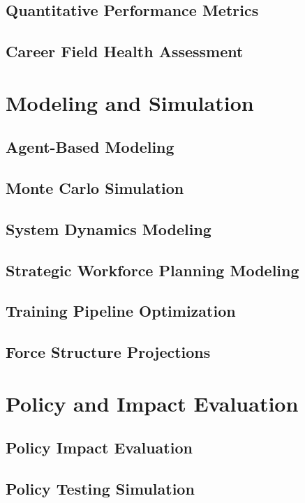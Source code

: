 \documentclass[12pt,a4paper]{article}
\begin{document}
\subsection{Quantitative Performance Metrics}


\subsection{Career Field Health Assessment}


\newpage
\section{Modeling and Simulation}

\subsection{Agent-Based Modeling}


\subsection{Monte Carlo Simulation}


\subsection{System Dynamics Modeling}


\subsection{Strategic Workforce Planning Modeling}


\subsection{Training Pipeline Optimization}


\subsection{Force Structure Projections}


\newpage
\section{Policy and Impact Evaluation}

\subsection{Policy Impact Evaluation}


\subsection{Policy Testing Simulation}

\end{document}
